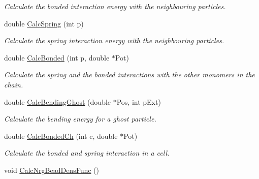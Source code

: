 \begin{DoxyCompactItemize}
\begin{DoxyCompactList}\small\item\em \-Calculate the bonded interaction energy with the neighbouring particles. \end{DoxyCompactList}\item 
\hypertarget{classForces_a9695c7258e7d8a3fb781280f258747cf}{double \hyperlink{classForces_a9695c7258e7d8a3fb781280f258747cf}{\-Calc\-Spring} (int p)}\label{classForces_a9695c7258e7d8a3fb781280f258747cf}

\begin{DoxyCompactList}\small\item\em \-Calculate the spring interaction energy with the neighbouring particles. \end{DoxyCompactList}\item 
double \hyperlink{classForces_adb6d3708682daf3cc9dd70081adfb894}{\-Calc\-Bonded} (int p, double $\ast$\-Pot)
\begin{DoxyCompactList}\small\item\em \-Calculate the spring and the bonded interactions with the other monomers in the chain. \end{DoxyCompactList}\item 
double \hyperlink{classForces_a2ba180156b26af3e2eea135743275fa9}{\-Calc\-Bending\-Ghost} (double $\ast$\-Pos, int p\-Ext)
\begin{DoxyCompactList}\small\item\em \-Calculate the bending energy for a ghost particle. \end{DoxyCompactList}\item 
\hypertarget{classForces_a6fec1e71c9031503f3f3b7a4f4851319}{double \hyperlink{classForces_a6fec1e71c9031503f3f3b7a4f4851319}{\-Calc\-Bonded\-Ch} (int c, double $\ast$\-Pot)}\label{classForces_a6fec1e71c9031503f3f3b7a4f4851319}

\begin{DoxyCompactList}\small\item\em \-Calculate the bonded and spring interaction in a cell. \end{DoxyCompactList}\item 
\hypertarget{classForces_a616546bdad154256f89f9eee067e8166}{void \hyperlink{classForces_a616546bdad154256f89f9eee067e8166}{\-Calc\-Nrg\-Bead\-Dens\-Func} ()}\label{classForces_a616546bdad154256f89f9eee067e8166}


\end{DoxyCompactItemize}
